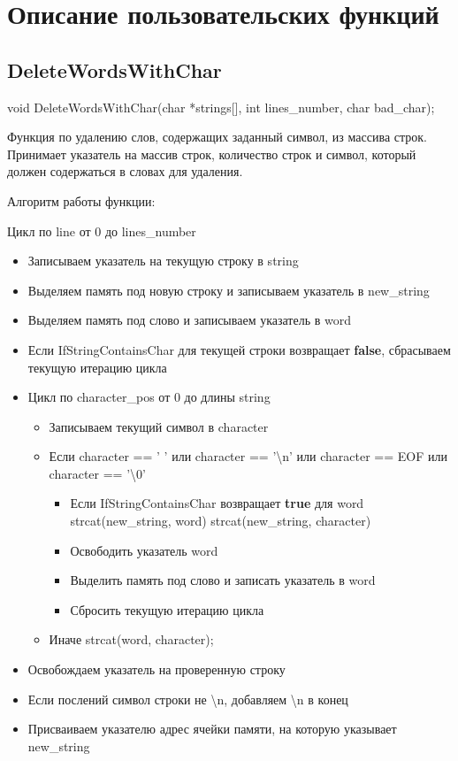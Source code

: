 \section*{Описание пользовательских функций}

\subsection*{DeleteWordsWithChar}
void DeleteWordsWithChar(char *strings[], int lines\_number, char bad\_char);

Функция по удалению слов, содержащих заданный символ, из массива строк. Принимает указатель на массив строк, количество строк и символ, который должен содержаться в словах для удаления.

Алгоритм работы функции:

Цикл по line от 0 до lines\_number
	\begin{itemize}
		\item Записываем указатель на текущую строку в string
		\item Выделяем память под новую строку и записываем указатель в new\_string
		\item Выделяем память под слово и записываем указатель в word
		\item Если IfStringContainsChar для текущей строки возвращает \textbf{false}, сбрасываем текущую итерацию цикла
		\item Цикл по character\_pos от 0 до длины string
		\begin{itemize}
			\item Записываем текущий символ в character
			\item Если character == ' ' или character == '\textbackslash n' или character == EOF или character == '\textbackslash 0'
			\begin{itemize}
				\item Если IfStringContainsChar возвращает \textbf{true} для word
				\subitem strcat(new\_string, word)
				\subitem strcat(new\_string, character)
				\item Освободить указатель word
				\item Выделить память под слово и записать указатель в word
				\item Сбросить текущую итерацию цикла
			\end{itemize}
			\item Иначе
			\subitem strcat(word, character);
		\end{itemize}
	\item Освобождаем указатель на проверенную строку
	\item Если послений символ строки не \textbackslash n, добавляем \textbackslash n в конец
	\item Присваиваем указателю адрес ячейки памяти, на которую указывает new\_string
	\end{itemize}

